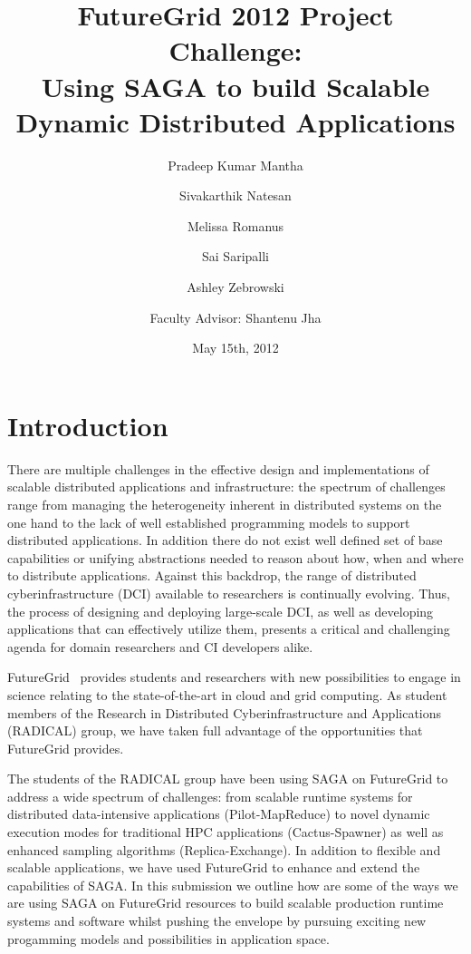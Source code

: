 \documentclass[]{paper}
\begin{document}
\title{FutureGrid 2012 Project Challenge:\\ Using SAGA to build Scalable Dynamic Distributed Applications}
\author{Pradeep Kumar Mantha 
  \and Sivakarthik Natesan 
  \and Melissa Romanus \\
  \and Sai Saripalli 
  \and Ashley Zebrowski 
  \and \large{Faculty Advisor: Shantenu Jha}\\
  }

\date{May 15th, 2012}
\maketitle


\section{Introduction}


There are multiple challenges in the effective design and implementations of scalable distributed applications and infrastructure: the spectrum of challenges range from managing the heterogeneity inherent in distributed systems on the one hand to the lack of well established programming models to support distributed applications. In addition there do not exist well defined set of base capabilities or unifying abstractions needed to reason about how, when and where to distribute applications. Against this backdrop, the range of distributed cyberinfrastructure (DCI) available to researchers is continually evolving.  Thus, the process of designing and deploying large-scale DCI, as well as developing applications that can effectively utilize them, presents a critical and challenging agenda for domain researchers and CI developers alike.

FutureGrid~\cite{fg} provides students and researchers with new possibilities to engage in science relating to the state-of-the-art in cloud and grid computing.  As student members of the Research in Distributed Cyberinfrastructure and Applications (RADICAL) group, we have taken full advantage of the opportunities that FutureGrid provides.

The students of the RADICAL group have been using SAGA on FutureGrid to address a wide spectrum of challenges: from scalable runtime systems for distributed data-intensive applications (Pilot-MapReduce) to novel dynamic execution modes for traditional HPC applications (Cactus-Spawner) as well as enhanced sampling algorithms (Replica-Exchange).  In addition to flexible and scalable applications, we have used FutureGrid to enhance and extend the capabilities of SAGA.  In this submission we outline how are some of the ways we are using SAGA on FutureGrid resources to build scalable production runtime systems and software whilst pushing the envelope by pursuing exciting new progamming models and possibilities in application space.
\end{document}
